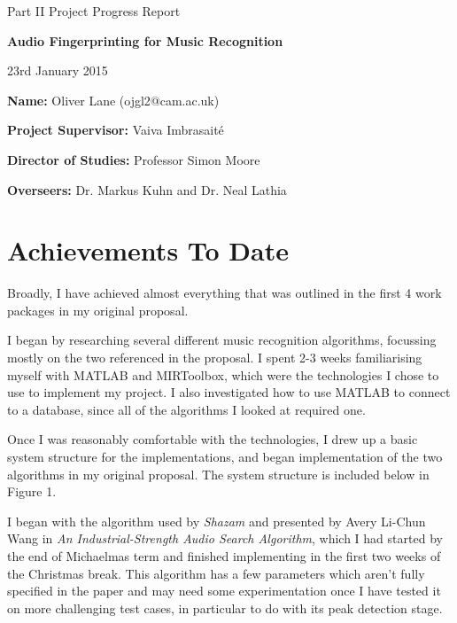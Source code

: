 \documentclass[12pt]{article}
\begin{document}
\thispagestyle{empty}

\medskip
{}
\medskip
{}

\vfil

\centerline{\large Part II Project Progress Report}
\vspace{0.4in}
\centerline{\Large\bf Audio Fingerprinting for Music Recognition}
\vspace{0.3in}
\centerline{\large 23rd January 2015}

\vfil

{\bf Name:} Oliver Lane (ojgl2@cam.ac.uk)

\vspace{0.2in}

{\bf Project Supervisor:} Vaiva Imbrasait\'{e}

\vspace{0.2in}

{\bf Director of Studies:} Professor Simon Moore

\vspace{0.2in}

{\bf Overseers:} Dr. Markus Kuhn and Dr. Neal Lathia

\vfil
\eject

\cleardoublepage
\setcounter{page}{1}

\section*{Achievements To Date}

Broadly, I have achieved almost everything that was outlined in the first 4 work packages in my original proposal.

I began by researching several different music recognition algorithms, focussing mostly on the two referenced in the proposal. I spent 2-3 weeks familiarising myself with MATLAB and MIRToolbox, which were the technologies I chose to use to implement my project. I also investigated how to use MATLAB to connect to a database, since all of the algorithms I looked at required one.

Once I was reasonably comfortable with the technologies, I drew up a basic system structure for the implementations, and began implementation of the two algorithms in my original proposal. The system structure is included below in Figure 1.

I began with the algorithm used by \emph{Shazam} and presented by Avery Li-Chun Wang in \emph{An Industrial-Strength Audio Search Algorithm}, which I had started by the end of Michaelmas term and finished implementing in the first two weeks of the Christmas break. This algorithm has a few parameters which aren't fully specified in the paper and may need some experimentation once I have tested it on more challenging test cases, in particular to do with its peak detection stage.
\end{document}
